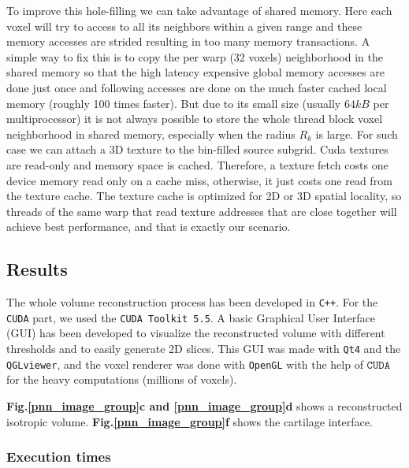 \documentclass[12pt,journal,compsoc]{IEEEtran}
\begin{document}
To improve this hole-filling we can take advantage of shared memory.
Here each voxel will try to access to all its neighbors within a given range and these memory accesses are strided resulting in too many memory transactions.
A simple way to fix this is to copy the per warp (32 voxels) neighborhood in the shared memory so that the high latency expensive global memory accesses are done just once and following accesses are done on the much faster cached local memory (roughly 100 times faster).
But due to its small size (usually $64kB$ per multiprocessor) it is not always possible to store the whole thread block voxel neighborhood in shared memory, especially when the radius $R_k$ is large.
For such case we can attach a 3D texture to the bin-filled source subgrid.
Cuda textures are read-only and memory space is cached.
Therefore, a texture fetch costs one device memory read only on a cache miss, otherwise, it just costs one read from the texture cache.
The texture cache is optimized for 2D or 3D spatial locality, so threads of the same warp that read texture addresses that are close together will achieve best performance, and that is exactly our scenario.

\subsection{Results}

The whole volume reconstruction process has been developed in \texttt{C++}.
For the \texttt{CUDA} part, we used the \texttt{CUDA Toolkit 5.5}.
A basic Graphical User Interface (GUI) has been developed to visualize the reconstructed volume with different thresholds and to easily generate 2D slices.
This GUI was made with \texttt{Qt4} and the \texttt{QGLviewer}, and the voxel renderer was done with \texttt{OpenGL} with the help of $\texttt{CUDA}$ for the heavy computations (millions of voxels).

\textbf{Fig.\ref{pnn_image_group}c and \ref{pnn_image_group}d} shows a reconstructed isotropic volume. \textbf{Fig.\ref{pnn_image_group}f} shows the cartilage interface.

\subsubsection{Execution times}
\end{document}
